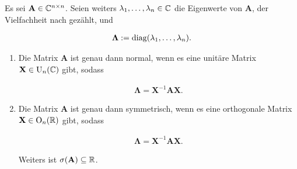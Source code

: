             \begin{theorem} \label{thm:spectral_theorem}

                Es sei $\mathbf A \in \mathbb C^{n \times n}$.
                Seien weiters $\lambda_1, \dots, \lambda_n \in \mathbb C$ die Eigenwerte von $\mathbf A$, der Vielfachheit nach gezählt, und

                \begin{align*}
                    \mathbf \Lambda
                    :=
                    \operatorname{diag}(\lambda_1, \dots, \lambda_n).
                \end{align*}

                \begin{enumerate}[
                    label = \arabic*.,
                    wide,
                    labelindent = 0pt
                ]

                    \item Die Matrix $\mathbf A$ ist genau dann normal, wenn es eine unitäre Matrix $\mathbf X \in \operatorname U_n(\mathbb C)$ gibt, sodass

                    \begin{align*}
                        \mathbf \Lambda
                        =
                        \mathbf X^{-1} \mathbf A \mathbf X.
                    \end{align*}

                    \item Die Matrix $\mathbf A$ ist genau dann symmetrisch, wenn es eine orthogonale Matrix $\mathbf X \in \operatorname O_n(\mathbb R)$ gibt, sodass

                    \begin{align*}
                        \mathbf \Lambda
                        =
                        \mathbf X^{-1} \mathbf A \mathbf X.
                    \end{align*}                    
                    
                    Weiters ist $\sigma(\mathbf A) \subseteq \mathbb R$.

                \end{enumerate}

            \end{theorem}

